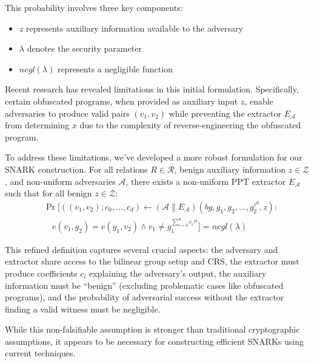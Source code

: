 This probability involves three key components:
\begin{itemize}
    \item $z$ represents auxiliary information available to the adversary
    \item $\lambda$ denotes the security parameter
    \item $negl(\lambda)$ represents a negligible function
\end{itemize}

Recent research has revealed limitations in this initial formulation. Specifically, certain obfuscated programs, when provided as auxiliary input $z$, enable adversaries to produce valid pairs $(v_1, v_2)$ while preventing the extractor $E_\mathcal{A}$ from determining $x$ due to the complexity of reverse-engineering the obfuscated program.

To address these limitations, we've developed a more robust formulation for our SNARK construction. For all relations $R \in \mathcal{R}$, benign auxiliary information $z \in \mathcal{Z}$, and non-uniform adversaries $\mathcal{A}$, there exists a non-uniform PPT extractor $E_\mathcal{A}$ such that for all benign $z \in \mathcal{Z}$:
\[ \begin{aligned}
&\Pr[((v_1, v_2); c_0, \dots, c_d) \gets (\mathcal{A} \| E_\mathcal{A})(bg, g_1, g_2, \dots, g_2^{\tau^d}, z) : \\
&\quad e(v_1, g_2) = e(g_1, v_2) \land v_1 \neq g_1^{\sum_{i=0}^d c_i \tau^i}] = negl(\lambda)
\end{aligned} \]

This refined definition captures several crucial aspects: the adversary and extractor share access to the bilinear group setup and CRS, the extractor must produce coefficients $c_i$ explaining the adversary's output, the auxiliary information must be ``benign'' (excluding problematic cases like obfuscated programs), and the probability of adversarial success without the extractor finding a valid witness must be negligible.

While this non-falsifiable assumption is stronger than traditional cryptographic assumptions, it appears to be necessary for constructing efficient SNARKs using current techniques.
